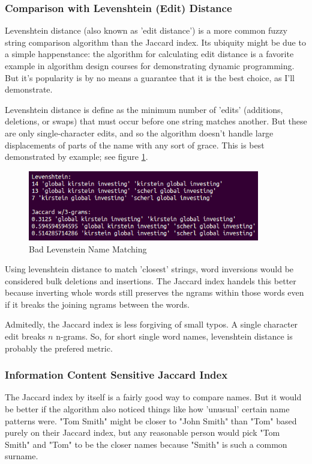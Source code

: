 \documentclass[11pt]{article}
\begin{document}
\subsubsection{Comparison with Levenshtein (Edit) Distance}
Levenshtein distance (also known as 'edit distance') is a more common fuzzy string comparison algorithm
than the Jaccard index. 
Its ubiquity might be due to a simple happenstance: the algorithm for calculating edit distance is
a favorite example in algorithm design courses for demonstrating dynamic programming.
But it's popularity is by no means a guarantee that it is the best choice, as I'll demonstrate.

Levenshtein distance is define as \cite{levenshtein} the minimum number of 'edits' 
(additions, deletions, or swaps) that must occur before one string matches another.
But these are only single-character edits, and so the algorithm doesn't handle large displacements
of parts of the name with any sort of grace.
This is best demonstrated by example; see figure \ref{fig:lev_comp}.

\begin{figure}[h!]
    \centering
    \includegraphics[width=0.9\textwidth,natwidth=1,natheight=1]{imgs/levenshtein_comp.png}
    \caption{Bad Levenstein Name Matching}
    \label{fig:lev_comp}
\end{figure}

Using levenshtein distance to match 'closest' strings, word 
inversions would be considered bulk deletions and insertions. 
The Jaccard index handels this better because inverting whole words 
still preserves the ngrams within those words even if it breaks
the joining ngrams between the words.

Admitedly, the Jaccard index is less forgiving of small typos. 
A single character edit breaks $n$ n-grams. So, for short single
word names, levenshtein distance is probably the prefered metric.

\subsubsection{Information Content Sensitive Jaccard Index}
The Jaccard index by itself is a fairly good way to compare names.
But it would be better if the algorithm also noticed things like
how 'unusual' certain name patterns were. 
"Tom Smith" might be closer to "John Smith" than "Tom" based purely
on their Jaccard index, but any reasonable person would pick
"Tom Smith" and "Tom" to be the closer names because "Smith" is
such a common surname.
\end{document}
